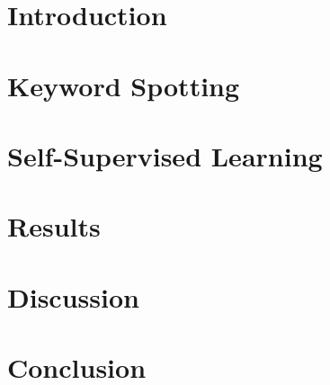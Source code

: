\documentclass[11pt,a4paper,twoside,openright, openany]{book}
\begin{document}
\cleardoublepage
\frontmatter{}





%

\tableofcontents

\mainmatter{}

    \chapter{Introduction} \label{ch:intro}
        
    
    \chapter{Keyword Spotting}
        

    \chapter{Self-Supervised Learning} \label{ch:theory}
        

    \chapter{Results}
        
    \chapter{Discussion} \label{ch:discussion}
        

    \chapter{Conclusion}
        

\label{lastofmain}
\nocite{*}


\appendix

\end{document}
